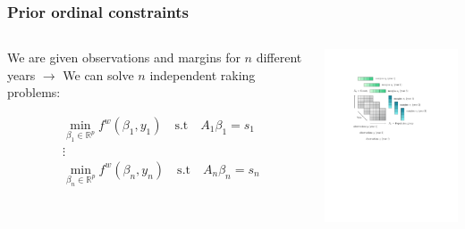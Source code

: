 \documentclass[aspectratio=169]{beamer}
\begin{document}
\begin{frame}
	\frametitle{Prior ordinal constraints}
	\begin{columns}
	\begin{column}{.4\textwidth}
	We are given observations and margins for $n$ different years $\rightarrow$ We can solve $n$ independent raking problems:

	\vspace{2em}

	\begin{equation*}
	\begin{aligned}
	& \min_{\beta_1 \in \mathbb{R}^p} f^w \left( \beta_1 , y_1 \right) \quad \text{s.t} \quad A_1 \beta_1 = s_1 \\
	& \vdots \\
	& \min_{\beta_n \in \mathbb{R}^p} f^w \left( \beta_n , y_n \right) \quad \text{s.t} \quad A_n \beta_n = s_n
	\end{aligned}
	\end{equation*}
	\end{column}

	\begin{column}{.6\textwidth}
		\centering
		\includegraphics[width=8cm, trim={4.5cm 13cm 5cm 5.5cm},clip]{raking_2D_multiple.pdf}
	\end{column}
	\end{columns}
\end{frame}
\end{document}

